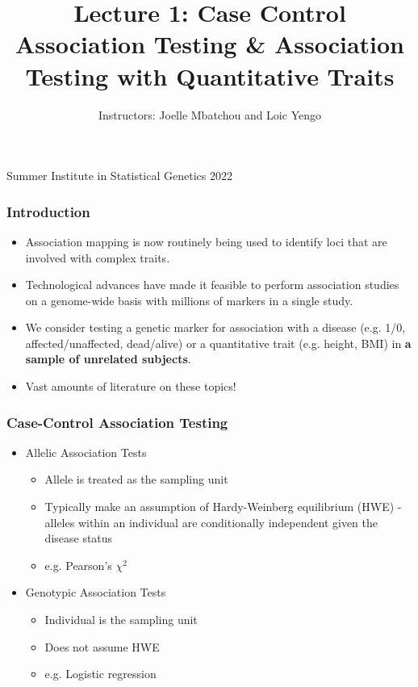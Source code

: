 \documentclass{beamer}
\title{Lecture 1: Case Control Association Testing \& Association Testing with Quantitative Traits}
\author{Instructors: Joelle Mbatchou and Loic Yengo}
\date{}
\begin{document}
\begin{frame}
\titlepage
\vspace{-2cm}
\begin{center}

{ \Large Summer Institute in Statistical Genetics 2022\\}


\end{center}
\end{frame}



\begin{frame}
\frametitle{\bf Introduction}
\begin{itemize}
\item Association mapping is now routinely being used to identify loci
that are involved with complex traits.
\item Technological advances have made it feasible to perform association studies
on a genome-wide basis with millions of markers in a single study.
\item  We consider testing a genetic marker for association with a disease (e.g. 1/0, affected/unaffected, dead/alive) or a quantitative trait (e.g. height, BMI) in \textbf{a sample of unrelated subjects}.
\item Vast amounts of literature on these topics!  
\end{itemize}
\end{frame}


\begin{frame}
\frametitle{\bf Case-Control Association Testing}
\begin{itemize}

\item Allelic Association Tests
  \begin{itemize}
\item Allele is treated as the sampling unit
\item Typically make an assumption of Hardy-Weinberg equilibrium (HWE) - alleles within an individual are conditionally independent given the disease status
\item e.g. Pearson's $\chi^2$ 
\end{itemize}
\item Genotypic Association Tests
\begin{itemize}
\item Individual is the sampling unit
\item Does not assume HWE
\item e.g. Logistic regression
\end{itemize}
\end{itemize}
\end{frame}
\end{document}

